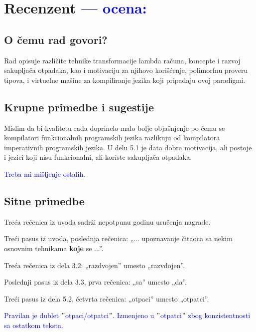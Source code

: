 \documentclass[a4paper]{report}
\newcommand{\odgovor}[1]{\textcolor{blue}{#1}}
\begin{document}
\chapter{Recenzent \odgovor{--- ocena:} }


\section{O čemu rad govori?}
Rad opisuje različite tehnike transformacije lambda računa, koncepte i razvoj sakupljača otpadaka, kao i motivaciju za njihovo korišćenje, polimorfnu proveru tipova, i virtuelne mašine za kompiliranje jezika koji pripadaju ovoj paradigmi.

\section{Krupne primedbe i sugestije}
Mislim da bi kvalitetu rada doprinelo malo bolje objašnjenje po čemu se kompilatori funkcionalnih programskih jezika razlikuju od kompilatora imperativnih programskih jezika. U delu 5.1 je data dobra motivacija, ali postoje i jezici koji nisu funkcionalni, ali koriste sakupljača otpadaka.

\odgovor{Treba mi mišljenje ostalih.}

\section{Sitne primedbe}
Treća rečenica iz uvoda sadrži nepotpunu godinu uručenja nagrade.

Treći pasus iz uvoda, poslednja rečenica: „... upoznavanje čitaoca sa nekim osnovnim tehnikama \textbf{koje} se ...”.

Treća rečenica iz dela 3.2: „razdvojen” umesto „razvdojen”.

Poslednji pasus iz dela 3.3, prva rečenica: „sa” umesto „da”.

Treći pasus iz dela 5.2, četvrta rečenica: „otpaci” umesto „otpatci”.

\odgovor{Pravilan je dublet $"$otpaci/otpatci$"$. Izmenjeno u $"$otpatci$"$ zbog konzistentnosti sa ostatkom teksta.}
\end{document}

